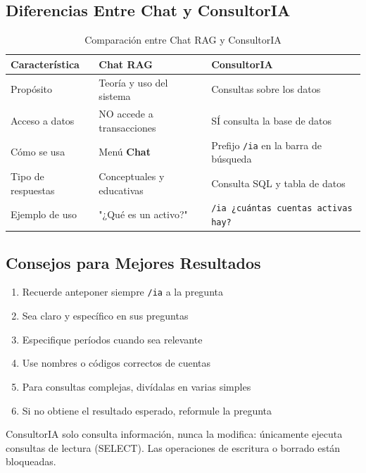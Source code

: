 \subsection{Diferencias Entre Chat y ConsultorIA}

\begin{table}[H]
\centering
\begin{tabular}{|p{4cm}|p{5cm}|p{5cm}|}
\hline
\textbf{Característica} & \textbf{Chat RAG} & \textbf{ConsultorIA} \\
\hline
Propósito & Teoría y uso del sistema & Consultas sobre los datos \\
\hline
Acceso a datos & NO accede a transacciones & SÍ consulta la base de datos \\
\hline
Cómo se usa & Menú \textbf{Chat} & Prefijo \texttt{/ia} en la barra de búsqueda \\
\hline
Tipo de respuestas & Conceptuales y educativas & Consulta SQL y tabla de datos \\
\hline
Ejemplo de uso & "¿Qué es un activo?" & \texttt{/ia ¿cuántas cuentas activas hay?} \\
\hline
\end{tabular}
\caption{Comparación entre Chat RAG y ConsultorIA}
\label{tab:comparacion}
\end{table}

\subsection{Consejos para Mejores Resultados}

\begin{enumerate}
    \item Recuerde anteponer siempre \texttt{/ia} a la pregunta
    \item Sea claro y específico en sus preguntas
    \item Especifique períodos cuando sea relevante
    \item Use nombres o códigos correctos de cuentas
    \item Para consultas complejas, divídalas en varias simples
    \item Si no obtiene el resultado esperado, reformule la pregunta
\end{enumerate}

\begin{warningbox}
ConsultorIA solo consulta información, nunca la modifica: únicamente ejecuta consultas de lectura (SELECT). Las operaciones de escritura o borrado están bloqueadas.
\end{warningbox}
